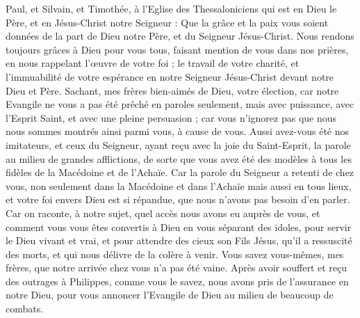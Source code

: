 \begin{multicols}{2}
\VerseOne{}Paul, et Silvain, et Timothée, à l'Eglise des Thessaloniciens qui est en Dieu le Père, et en Jésus-Christ notre Seigneur : Que la grâce et la paix vous soient données de la part de Dieu notre Père, et du Seigneur Jésus-Christ.
Nous rendons toujours grâces à Dieu pour vous tous, faisant mention de vous dans nos prières,
en nous rappelant l’œuvre de votre foi ; le travail de votre charité, et l'immuabilité de votre espérance en notre Seigneur Jésus-Christ devant notre Dieu et Père.
Sachant, mes frères bien-aimés de Dieu, votre élection,
car notre Evangile ne vous a pas été prêché en paroles seulement, mais avec puissance, avec l’Esprit Saint, et avec une pleine persuasion ; car vous n’ignorez pas que nous nous sommes montrés ainsi parmi vous, à cause de vous.
Aussi avez-vous été nos imitateurs, et ceux du Seigneur, ayant reçu avec la joie du Saint-Esprit, la parole au milieu de grandes afflictions,
de sorte que vous avez été des modèles à tous les fidèles de la Macédoine et de l’Achaïe.
Car la parole du Seigneur a retenti de chez vous, non seulement dans la Macédoine et dans l'Achaïe mais aussi en tous lieux, et votre foi envers Dieu est si répandue, que nous n'avons pas besoin d'en parler.
Car on raconte, à notre sujet, quel accès nous avons eu auprès de vous, et comment vous vous êtes convertis à Dieu en vous séparant des idoles, pour servir le Dieu vivant et vrai,
et pour attendre des cieux son Fils Jésus, qu'il a ressuscité des morts, et qui nous délivre de la colère à venir.
\VerseOne{}Vous savez vous-mêmes, mes frères, que notre arrivée chez vous n'a pas été vaine.
Après avoir souffert et reçu des outrages à Philippes, comme vous le savez, nous avons pris de l’assurance en notre Dieu, pour vous annoncer l’Evangile de Dieu au milieu de beaucoup de combats.

\end{multicols}
